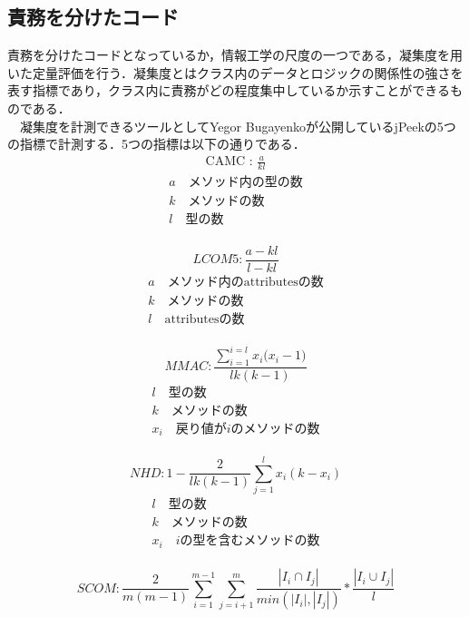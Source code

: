 \documentclass[12pt, a4paper]{jreport}
\begin{document}
\subsection{責務を分けたコード}
責務を分けたコードとなっているか，情報工学の尺度の一つである，凝集度を用いた定量評価を行う．凝集度とはクラス内のデータとロジックの関係性の強さを表す指標であり，クラス内に責務がどの程度集中しているか示すことができるものである．
\\　凝集度を計測できるツールとしてYegor Bugayenko\cite{jPeek}が公開しているjPeekの5つの指標で計測する．5つの指標は以下の通りである．
\\
\begin{gather}
\text{CAMC : }
\frac{a}{kl}
\end{gather}
\begin{gather*}
a\text{　メソッド内の型の数}
\\k\text{　メソッドの数}
\\l\text{　型の数}
\end{gather*}
\\
\begin{equation}
LCOM5:
\frac{a-kl}{l-kl}
\end{equation}
\begin{gather*}
a\text{　メソッド内のattributesの数}
\\k\text{　メソッドの数}
\\l\text{　attributesの数}
\end{gather*}
\\
\begin{equation}
MMAC:
\frac{\sum^{i=l}_{i=1}{{x}_{i}{({x}_{i}-1})}}{lk(k-1)}
\end{equation}
\begin{gather*}
l\text{　型の数}
\\k\text{　メソッドの数}
\\{x}_{i}\text{　戻り値が}i\text{のメソッドの数}
\end{gather*}
\\
\begin{equation}
NHD:
1-\frac{2}{lk(k-1)}\sum^{l}_{j=1}{x}_{i}{(k-{x}_{i})}
\end{equation}
\begin{gather*}
l\text{　型の数}
\\k\text{　メソッドの数}
\\{x}_{i}\text{　}i\text{の型を含むメソッドの数}
\end{gather*}
\\
\begin{equation}
SCOM:
\frac{2}{m(m-1)}\sum^{m-1}_{i=1}\sum^{m}_{j=i+1}\frac{|{I}_{i}\cap{I}_{j}|}{min(|{I}_{i}|, |{I}_{j}|)}*\frac{|{I}_{i}\cup{I}_{j}|}{l}
\end{equation}
\end{document}
